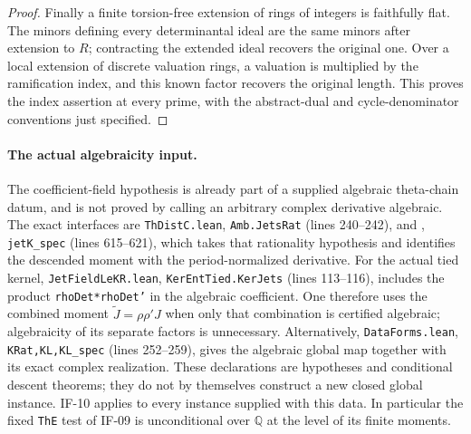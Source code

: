 \documentclass[11pt,a4paper]{article}
\theoremstyle{definition}
\theoremstyle{remark}
\begin{document}
\begin{proof}
Finally a finite torsion-free extension of rings of integers is
faithfully flat. The minors defining every determinantal ideal are
the same minors after extension to $R$; contracting the extended ideal
recovers the original one. Over a local extension of discrete valuation
rings, a valuation is multiplied by the ramification index, and this
known factor recovers the original length. This proves the index
assertion at every prime, with the abstract-dual and cycle-denominator
conventions just specified.
\end{proof}

\paragraph{The actual algebraicity input.}
The coefficient-field hypothesis is already part of a supplied
algebraic theta-chain datum, and is not proved by calling an arbitrary
complex derivative algebraic. The exact interfaces are
\texttt{ThDistC.lean}, \texttt{Amb.JetsRat} (lines 240--242), and
, \texttt{jetK\_spec}
(lines 615--621), which takes that rationality hypothesis and identifies
the descended moment with the period-normalized derivative.
For the actual tied kernel, \texttt{JetFieldLeKR.lean},
\texttt{KerEntTied.KerJets} (lines 113--116), includes the product
\texttt{rhoDet*rhoDet'} in the algebraic coefficient. One therefore
uses the combined moment $\widetilde J=\rho\rho'J$ when only that
combination is certified algebraic; algebraicity of its separate
factors is unnecessary. Alternatively,
\texttt{DataForms.lean}, \texttt{KRat,KL,KL\_spec} (lines 252--259),
gives the algebraic global map together with its exact complex
realization. These declarations are hypotheses and conditional descent
theorems; they do not by themselves construct a new closed global
instance. IF-10 applies to every instance supplied with this data. In
particular the fixed \texttt{ThE} test of IF-09 is unconditional over
$\mathbb Q$ at the level of its finite moments.
\end{document}
